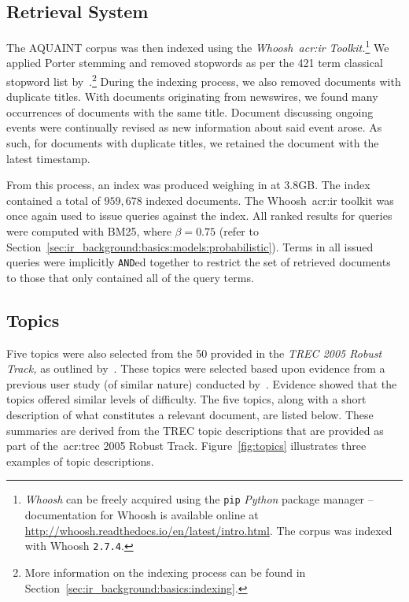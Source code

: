 \subsection{Retrieval System}\label{sec:methodology:collection:system}
The AQUAINT corpus was then indexed using the \emph{Whoosh~\gls{acr:ir} Toolkit.}\footnote{\emph{Whoosh} can be freely acquired using the \texttt{pip} \emph{Python} package manager -- documentation for Whoosh is available online at \url{http://whoosh.readthedocs.io/en/latest/intro.html}.  The corpus was indexed with Whoosh \texttt{2.7.4}.} We applied Porter stemming and removed stopwords as per the 421 term classical stopword list by~\cite{fox1992stopwords}.\footnote{More information on the indexing process can be found in Section~\ref{sec:ir_background:basics:indexing}.} During the indexing process, we also removed documents with duplicate titles. With documents originating from newswires, we found many occurrences of documents with the same title. Document discussing ongoing events were continually revised as new information about said event arose. As such, for documents with duplicate titles, we retained the document with the latest timestamp.

From this process, an index was produced weighing in at $3.8$GB. The index contained a total of $959,678$ indexed documents. The Whoosh~\gls{acr:ir} toolkit was once again used to issue queries against the index. All ranked results for queries were computed with BM25, where $\beta=0.75$ (refer to Section~\ref{sec:ir_background:basics:models:probabilistic}). Terms in all issued queries were implicitly \texttt{AND}ed together to restrict the set of retrieved documents to those that only contained all of the query terms.

\subsection{Topics}\label{sec:methodology:collection:topics}
Five topics were also selected from the 50 provided in the \emph{TREC 2005 Robust Track,} as outlined by~\cite{voorhees2006trec_robust}. These topics were selected based upon evidence from a previous user study (of similar nature) conducted by~\cite{kelly2009user_study}. Evidence showed that the topics offered similar levels of difficulty. The five topics, along with a short description of what constitutes a relevant document, are listed below. These summaries are derived from the TREC topic descriptions that are provided as part of the~\gls{acr:trec} 2005 Robust Track. Figure~\ref{fig:topics} illustrates three examples of topic descriptions.

